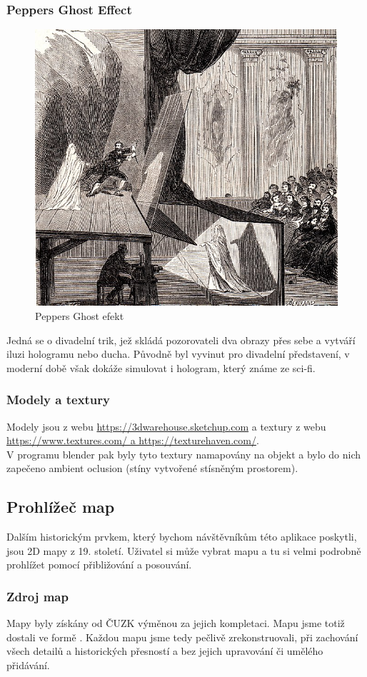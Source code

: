 \subsubsection{Peppers Ghost Effect}
\begin{figure}[H]
	\centering
	\includegraphics[width=.5\textwidth]{img/Peppers_Ghost.jpg}
	\caption[Peppers Ghost efekt - zdroj: \url{https://commons.wikimedia.org/wiki/File:Peppers_Ghost.jpg}]{Peppers Ghost efekt}
\end{figure}

Jedná se o divadelní trik, jež skládá pozorovateli dva obrazy přes sebe a vytváří iluzi
hologramu nebo ducha. Původně byl vyvinut pro divadelní představení, v moderní
době však dokáže simulovat i hologram, který známe ze sci-fi.

\subsubsection{Modely a textury}
Modely jsou z webu \url{https://3dwarehouse.sketchup.com} a
textury z webu \url{https://www.textures.com/ a https://texturehaven.com/}.\\
V programu blender pak byly tyto textury namapovány na objekt a bylo do nich
zapečeno ambient oclusion (stíny vytvořené stísněným prostorem).



\subsection{Prohlížeč map}
Dalším historickým prvkem, který bychom návštěvníkům této aplikace poskytli, jsou
2D mapy z 19. století. Uživatel si může vybrat mapu a tu si velmi podrobně
prohlížet pomocí přibližování a posouvání.

\subsubsection{Zdroj map}
Mapy byly získány od ČUZK výměnou za jejich kompletaci.
Mapu jsme totiž dostali ve formě .
Každou mapu jsme tedy pečlivě zrekonstruovali, při zachování všech detailů a
historických přesností a bez jejich upravování či umělého přidávání.
